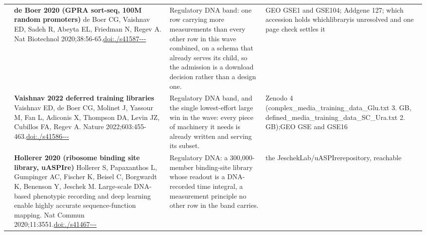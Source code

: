 \begin{landscape}
\begin{longtable}{@{}r@{\hspace{4pt}} L{78mm} L{72mm} L{76mm}@{}}
 & \textbf{de Boer 2020 (GPRA sort-seq, 100M random promoters)} \newline de Boer CG, Vaishnav ED, Sadeh R, Abeyta EL, Friedman N, Regev A. Nat Biotechnol 2020;38:56-65.\newline \href{https://doi.org/10.1038/s41587-019-0315-8}{doi:./\allowbreak s41587---} & Regulatory DNA band: one row carrying more measurements than every other row in this wave combined, on a schema that already serves its child, so the admission is a download decision rather than a design one. & GEO GSE1 an\allowbreak d GSE104; Add\allowbreak gene 127; whi\allowbreak ch acces\allowbreak sion hol\allowbreak ds which\allowbreak  library\allowbreak  is unre\allowbreak solved a\allowbreak nd one p\allowbreak age chec\allowbreak k settle\allowbreak s it \\
 & \textbf{Vaishnav 2022 deferred training libraries} \newline Vaishnav ED, de Boer CG, Molinet J, Yassour M, Fan L, Adiconis X, Thompson DA, Levin JZ, Cubillos FA, Regev A. Nature 2022;603:455-463.\newline \href{https://doi.org/10.1038/s41586-022-04506-6}{doi:./\allowbreak s41586---} & Regulatory DNA band, and the single lowest-effort large win in the wave: every piece of machinery it needs is already written and serving its subset. & Zenodo 4 (\allowbreak complex\_\allowbreak media\_\allowbreak trainin\allowbreak g\_\allowbreak data\_\allowbreak Glu.\allowbreak txt 3. GB, \allowbreak defined\_\allowbreak media\_\allowbreak trainin\allowbreak g\_\allowbreak data\_\allowbreak SC\_\allowbreak Ura.\allowbreak txt 2. GB);\allowbreak  GEO GSE a\allowbreak nd GSE16 \\
 & \textbf{Hollerer 2020 (ribosome binding site library, uASPIre)} \newline Hollerer S, Papaxanthos L, Gumpinger AC, Fischer K, Beisel C, Borgwardt K, Benenson Y, Jeschek M. Large-scale DNA-based phenotypic recording and deep learning enable highly accurate sequence-function mapping. Nat Commun 2020;11:3551.\newline \href{https://doi.org/10.1038/s41467-020-17222-4}{doi:./\allowbreak s41467---} & Regulatory DNA: a 300,000-member binding-site library whose readout is a DNA-recorded time integral, a measurement principle no other row in the band carries. & the Jesc\allowbreak hekLab/\allowbreak uASPIre\allowbreak  reposit\allowbreak ory, rea\allowbreak chable \\

\end{longtable}
\end{landscape}

